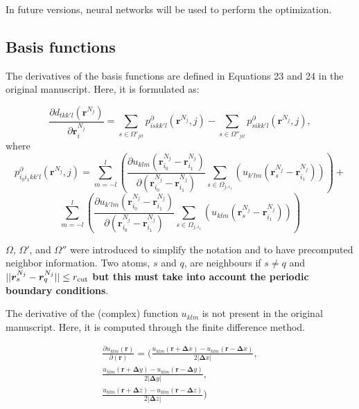 \documentclass[12pt]{article}
\begin{document}
In future versions, neural networks will be used to perform the optimization.

\subsection{Basis functions}

The derivatives of the basis functions are defined in Equations 23 and 24 in the original manuscript. Here, it is formulated as:

\begin{equation}
    \label{eq:derd}
    \frac{\partial d_{tkk'l}(\bm r^{N_j})}{\partial \bm r^{N_j}_i} = \sum_{s \in \Omega'_{jit}} p_{iskk'l}^{\partial}(\bm r^{N_j}, j) - \sum_{s \in \Omega''_{jit}} p_{sikk'l}^{\partial} ( \bm r^{N_j}, j),
\end{equation}
where 
\begin{equation}
    p_{i_0i_1kk'l}^{\partial}(\bm r^{N_j}, j) = \sum_{m=-l}^l \left( \frac{\partial u_{klm}(\bm r_{i_0}^{N_j}- \bm r_{i_1}^{N_j})}{\partial (\bm r_{i_0}^{N_j}-\bm r_{i_1}^{N_j})} \sum_{s \in \Omega_{j,i_1}} \left( u_{k'lm} (\bm r^{N_j}_s- \bm r^{N_j}_{i_1}) \right) \right) + 
\end{equation}
\begin{equation*}
\sum_{m=-l}^l \left( \frac{\partial u_{k'lm}(\bm r_{i_0}^{N_j}- \bm r_{i_1}^{N_j})}{\partial (\bm r_{i_0}^{N_j}- \bm r_{i_1}^{N_j})} \sum_{s \in \Omega_{j,i_1}} \left( u_{klm} (\bm r^{N_j}_s- \bm r^{N_j}_{i_1}) \right) \right)
\end{equation*}

$\Omega$, $\Omega'$, and $\Omega''$ were introduced to simplify the notation and to have precomputed neighbor information. Two atoms, $s$ and $q$, are neighbours if $s \ne q$ and $|| \bm r_s^{N_j} - \bm r_q^{N_j} || \le r_{\rm cut} $ \textbf{but this must take into account the periodic boundary conditions}. 

The derivative of the (complex) function $u_{klm}$ is not present in the original manuscript. Here, it is computed through the finite difference method.

\begin{equation}
\begin{split}
     \frac{\partial u_{klm}(\bm r)}{\partial (\bm r)} =  
        \bigg( \frac{ u_{klm}(\bm r + \bm \Delta x) - u_{klm}(\bm r - \bm \Delta x) } {2 |\bm \Delta x|}, \\
          \frac{ u_{klm}(\bm r + \bm \Delta y) - u_{klm}(\bm r - \bm \Delta y) } {2 |\bm \Delta y|},\\
          \frac{ u_{klm}(\bm r + \bm \Delta z) - u_{klm}(\bm r - \bm \Delta z) } {2 |\bm \Delta z|} \bigg)
\end{split}
\end{equation}
\end{document}
